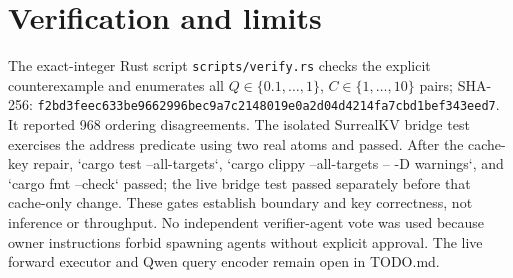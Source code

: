 \documentclass{article}
\begin{document}
\section*{Verification and limits}
The exact-integer Rust script \texttt{scripts/verify.rs} checks the explicit counterexample and enumerates all $Q\in\{0.1,\ldots,1\}$, $C\in\{1,\ldots,10\}$ pairs; SHA-256: \texttt{f2bd3feec633be9662996bec9a7c2148019e0a2d04d4214fa7cbd1bef343eed7}. It reported 968 ordering disagreements. The isolated SurrealKV bridge test exercises the address predicate using two real atoms and passed. After the cache-key repair, `cargo test --all-targets`, `cargo clippy --all-targets -- -D warnings`, and `cargo fmt --check` passed; the live bridge test passed separately before that cache-only change. These gates establish boundary and key correctness, not inference or throughput. No independent verifier-agent vote was used because owner instructions forbid spawning agents without explicit approval. The live forward executor and Qwen query encoder remain open in TODO.md.
\end{document}
